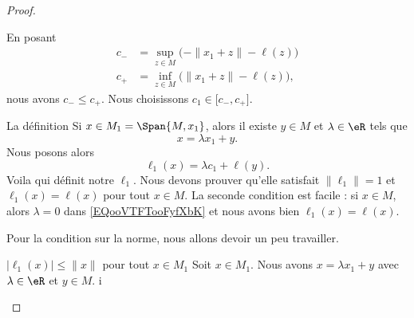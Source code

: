 \begin{proof}
\begin{subproof}
            En posant
            \begin{subequations}
                \begin{align}
                    c_-&=\sup_{z\in M}\big( -\| x_1+z \|-\ell(z) \big)\\
                    c_+&=\inf_{z\in M}\big(  \| x_1+z \|-\ell(z) \big),
                \end{align}
            \end{subequations}
            nous avons \( c_-\leq c_+\). Nous choisissons \( c_1\in \mathopen[ c_- , c_+ \mathclose]\).
        \item[La définition]
            Si \( x\in M_1=\Span{M,x_1}\), alors il existe \( y\in M\) et \( \lambda\in \eR\) tels que
            \begin{equation}
                x=\lambda x_1+y.
            \end{equation}
            Nous posons alors
            \begin{equation}        \label{EQooVTFTooFyfXbK}
                \ell_1(x)=\lambda c_1+\ell(y).
            \end{equation}
            Voila qui définit notre \( \ell_1\). Nous devons prouver qu'elle satisfait \( \| \ell_1 \|=1\) et \( \ell_1(x)=\ell(x)\) pour tout \( x\in M\). La seconde condition est facile : si \( x\in M\), alors \( \lambda=0\) dans \eqref{EQooVTFTooFyfXbK} et nous avons bien \( \ell_1(x)=\ell(x)\).

            Pour la condition sur la norme, nous allons devoir un peu travailler.
        \item[\( | \ell_1(x) |\leq \| x \|\) pour tout \( x\in M_1\)]
            Soit \( x\in M_1\). Nous avons \( x=\lambda x_1+y\) avec \( \lambda\in \eR\) et \( y\in M\). i


\end{subproof}
\end{proof}
